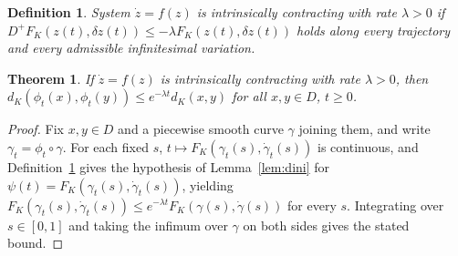\documentclass[10pt,a4paper]{amsart}
\newtheorem{definition}{Definition}
\newtheorem{theorem}{Theorem}
\begin{document}
\begin{definition}
\label{def:intrinsiccontraction}
System $\dot z=f(z)$ is intrinsically contracting with rate $\lambda>0$ if $D^+F_K(z(t),\delta z(t))\le-\lambda F_K(z(t),\delta z(t))$ holds along every trajectory and every admissible infinitesimal variation.
\end{definition}

\begin{theorem}
\label{thm:global}
If $\dot z=f(z)$ is intrinsically contracting with rate $\lambda>0$, then $d_K(\phi_t(x),\phi_t(y))\le e^{-\lambda t}d_K(x,y)$ for all $x,y\in D$, $t\ge0$.
\end{theorem}

\begin{proof}
Fix $x,y\in D$ and a piecewise smooth curve $\gamma$ joining them, and write $\gamma_t=\phi_t\circ\gamma$. For each fixed $s$, $t\mapsto F_K(\gamma_t(s),\dot\gamma_t(s))$ is continuous, and Definition~\ref{def:intrinsiccontraction} gives the hypothesis of Lemma~\ref{lem:dini} for $\psi(t)=F_K(\gamma_t(s),\dot\gamma_t(s))$, yielding $F_K(\gamma_t(s),\dot\gamma_t(s))\le e^{-\lambda t}F_K(\gamma(s),\dot\gamma(s))$ for every $s$. Integrating over $s\in[0,1]$ and taking the infimum over $\gamma$ on both sides gives the stated bound.
\end{proof}
\end{document}
